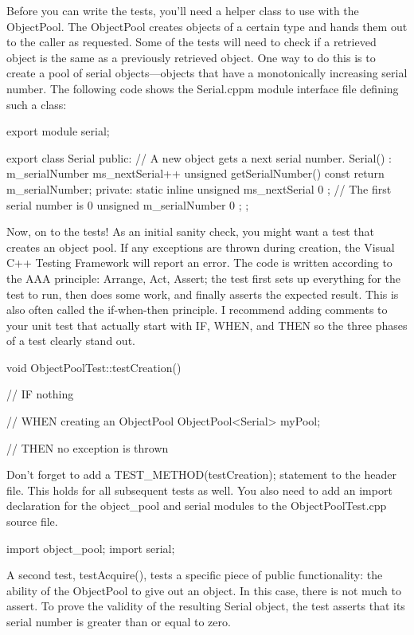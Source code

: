 Before you can write the tests, you’ll need a helper class to use with the ObjectPool. The ObjectPool creates objects of a certain type and hands them out to the caller as requested. Some of the tests will need to check if a retrieved object is the same as a previously retrieved object. One way to do this is to create a pool of serial objects—objects that have a monotonically increasing serial number. The following code shows the Serial.cppm module interface file defining such a class:

\begin{cpp}
export module serial;

export class Serial
{
    public:
        // A new object gets a next serial number.
        Serial() : m_serialNumber { ms_nextSerial++ } { }
        unsigned getSerialNumber() const { return m_serialNumber; }
    private:
        static inline unsigned ms_nextSerial { 0 }; // The first serial number is 0
        unsigned m_serialNumber { 0 };
};
\end{cpp}

Now, on to the tests! As an initial sanity check, you might want a test that creates an object pool. If any exceptions are thrown during creation, the Visual C++ Testing Framework will report an error. The code is written according to the AAA principle: Arrange, Act, Assert; the test first sets up everything for the test to run, then does some work, and finally asserts the expected result. This is also often called the if-when-then principle. I recommend adding comments to your unit test that actually start with IF, WHEN, and THEN so the three phases of a test clearly stand out.

\begin{cpp}
void ObjectPoolTest::testCreation()
{
    // IF nothing

    // WHEN creating an ObjectPool
    ObjectPool<Serial> myPool;

    // THEN no exception is thrown
}
\end{cpp}

Don’t forget to add a TEST\_METHOD(testCreation); statement to the header file. This holds for all subsequent tests as well. You also need to add an import declaration for the object\_pool and serial modules to the ObjectPoolTest.cpp source file.

\begin{cpp}
import object_pool;
import serial;
\end{cpp}

A second test, testAcquire(), tests a specific piece of public functionality: the ability of the ObjectPool to give out an object. In this case, there is not much to assert. To prove the validity of the resulting Serial object, the test asserts that its serial number is greater than or equal to zero.

